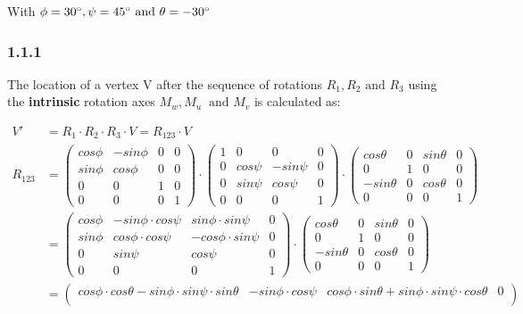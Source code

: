 With $\phi = 30\degree, \psi = 45\degree \text{ and } \theta = -30\degree$

\subsubsection*{1.1.1}

The location of a vertex V after the sequence of rotations $R_1, R_2 \text{ and } R_3$ using the \textbf{intrinsic} rotation axes $M_w, M_u\ \text{ and } M_v$ is calculated as:

\begin{align*}
V' &= R_1\cdot R_2\cdot R_3\cdot V = R_{123} \cdot V \\
R_{123} &= 
\begin{pmatrix}
cos\phi & -sin\phi & 0 & 0 \\
sin\phi & cos\phi & 0 & 0 \\
0 & 0 & 1 & 0 \\
0 & 0 & 0 & 1 
\end{pmatrix}
\cdot
\begin{pmatrix}
1 & 0 & 0 & 0 \\
0 & cos\psi & -sin\psi & 0 \\
0 & sin\psi & cos\psi & 0 \\
0 & 0 & 0 & 1 
\end{pmatrix} 
\cdot
\begin{pmatrix}
cos\theta & 0 & sin\theta & 0 \\
0 & 1 & 0 & 0 \\
-sin\theta & 0 & cos\theta & 0 \\
0 & 0 & 0 & 1 
\end{pmatrix}\\
 &=
\begin{pmatrix}
cos\phi & -sin\phi\cdot cos\psi & sin\phi\cdot sin\psi & 0 \\
sin\phi & cos\phi\cdot cos\psi & -cos\phi\cdot sin\psi & 0 \\
0 & sin\psi & cos\psi  & 0 \\
0 & 0 & 0 & 1  
\end{pmatrix}
\cdot
\begin{pmatrix}
cos\theta & 0 & sin\theta & 0 \\
0 & 1 & 0 & 0 \\
-sin\theta & 0 & cos\theta & 0 \\
0 & 0 & 0 & 1 
\end{pmatrix}\\
 &=
 \begin{pmatrix}
 cos\phi\cdot cos\theta-sin\phi\cdot sin\psi \cdot sin\theta & -sin\phi\cdot cos\psi & cos\phi \cdot sin\theta + sin\phi\cdot sin\psi \cdot cos\theta & 0 \\

\end{pmatrix}
\end{align*}
